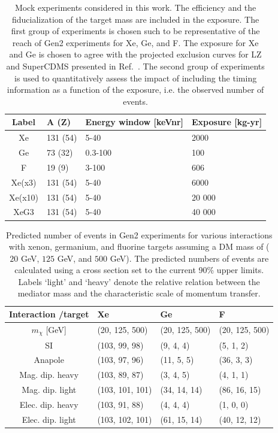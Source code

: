 \documentclass[11pt]{article}
\begin{document}
\begin{table}[tbp]
  \setlength{\extrarowheight}{3pt}
  \setlength{\tabcolsep}{10pt}
  \begin{center}
	\begin{tabular}{|c||m{2.3cm}|m{4.2cm}|m{2.8cm}|}  \hline
	Label & A (Z) & Energy window [keVnr] & Exposure [kg-yr] \\ \hline
	\hline
	Xe & 131 (54) & 5-40 & 2000 \\  \hline
	Ge & 73 (32) & 0.3-100 & 100  \\  \hline
	F &  19 (9) & 3-100 & 606 \\  \hline
	\hline
	Xe(x3) & 131 (54) & 5-40 & 6000 \\  \hline
	Xe(x10) & 131 (54) & 5-40 & 20 000 \\  \hline
	XeG3 & 131 (54) & 5-40 & 40 000 \\ \hline \hline
	\end{tabular}
  \end{center}
\caption{Mock experiments considered in this work. The efficiency and the fiducialization of the target mass are included in the exposure. The first group of experiments is chosen such to be representative of the reach of Gen2 experiments for Xe, Ge, and F. The exposure for Xe and Ge is chosen to agree with the projected exclusion curves for LZ and SuperCDMS presented in Ref.~\cite{Cushman:2013zza}. The second group of experiments is used to quantitatively assess the impact of including the timing information as a function of the exposure, i.e. the observed number of events. }
\label{tab:experiments}
\end{table}
\begin{table}[t] 
\setlength{\extrarowheight}{3pt}
\setlength{\tabcolsep}{12pt}
\begin{center}
\begin{tabular}{|c||m{3cm}|m{3cm}|m{3cm}|}\hline
Interaction /target & Xe & Ge & F\\
\hline\hline 
$m_\chi$ [GeV] & (20, 125, 500) & (20, 125, 500) & (20, 125, 500) \\
\hline\hline 
SI& (103, 99, 98) & (9, 4, 4)& (5, 1, 2)\\ \hline
Anapole& (103, 97, 96)& (11, 5, 5)& (36, 3, 3)\\ \hline
Mag. dip. heavy& (103, 89, 87)& (3, 4, 5)& (4, 1, 1)\\ \hline
Mag. dip. light& (103, 101, 101)& (34, 14, 14)& (86, 16, 15)\\ \hline
Elec. dip. heavy& (103, 91, 88)& (4, 4, 4)& (1, 0, 0)\\ \hline
Elec. dip. light& (103, 102, 101)& (61, 15, 14)& (40, 12, 12)\\ \hline \hline
\end{tabular}
\end{center}
\caption{Predicted number of events in Gen2 experiments for various interactions with xenon, germanium, and fluorine targets assuming a DM mass of ($20$ GeV, $125$ GeV, and $500$ GeV). The predicted numbers of events are calculated using a cross section set to the current 90\% upper limits. Labels `light' and `heavy' denote the relative relation between the mediator mass and the characteristic scale of momentum transfer. }
\label{tab:pred_events}
\end{table}
\end{document}

